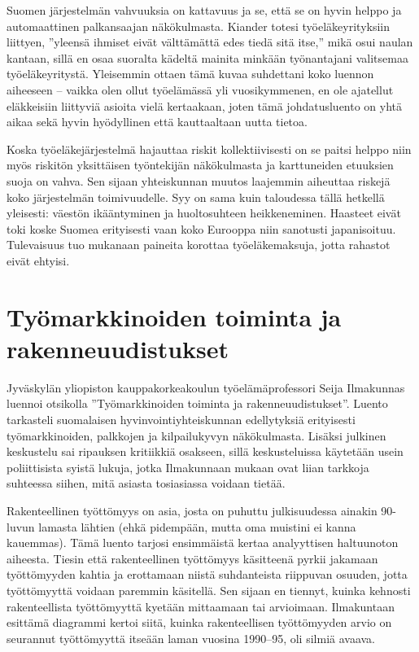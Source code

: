 \documentclass[12pt]{article}
\begin{document}
Suomen järjestelmän vahvuuksia on kattavuus ja se, että se on hyvin helppo ja
automaattinen palkansaajan näkökulmasta. Kiander totesi työeläkeyrityksiin
liittyen, ''yleensä ihmiset eivät välttämättä edes tiedä sitä itse,'' mikä osui
naulan kantaan, sillä en osaa suoralta kädeltä mainita minkään työnantajani
valitsemaa työeläkeyritystä. Yleisemmin ottaen tämä kuvaa suhdettani koko
luennon aiheeseen -- vaikka olen ollut työelämässä yli vuosikymmenen, en ole
ajatellut eläkkeisiin liittyviä asioita vielä kertaakaan, joten tämä
johdatusluento on yhtä aikaa sekä hyvin hyödyllinen että kauttaaltaan uutta
tietoa.

Koska työeläkejärjestelmä hajauttaa riskit kollektiivisesti on se paitsi helppo
niin myös riskitön yksittäisen työntekijän näkökulmasta ja karttuneiden
etuuksien suoja on vahva. Sen sijaan yhteiskunnan muutos laajemmin aiheuttaa
riskejä koko järjestelmän toimivuudelle. Syy on sama kuin taloudessa tällä
hetkellä yleisesti: väestön ikääntyminen ja huoltosuhteen heikkeneminen.
Haasteet eivät toki koske Suomea erityisesti vaan koko Eurooppa niin sanotusti
japanisoituu. Tulevaisuus tuo mukanaan paineita korottaa työeläkemaksuja, jotta
rahastot eivät ehtyisi.


\newpage
\section{Työmarkkinoiden toiminta ja rakenneuudistukset}

Jyväskylän yliopiston kauppakorkeakoulun työelämäprofessori Seija Ilmakunnas
luennoi otsikolla ''Työmarkkinoiden toiminta ja rakenneuudistukset''. Luento
tarkasteli suomalaisen hyvinvointiyhteiskunnan edellytyksiä erityisesti
työmarkkinoiden, palkkojen ja kilpailukyvyn näkökulmasta. Lisäksi julkinen
keskustelu sai ripauksen kritiikkiä osakseen, sillä keskusteluissa käytetään
usein poliittisista syistä lukuja, jotka Ilmakunnaan mukaan ovat liian tarkkoja
suhteessa siihen, mitä asiasta tosiasiassa voidaan tietää.

Rakenteellinen työttömyys on asia, josta on puhuttu julkisuudessa ainakin
90-luvun lamasta lähtien (ehkä pidempään, mutta oma muistini ei kanna
kauemmas). Tämä luento tarjosi ensimmäistä kertaa analyyttisen haltuunoton
aiheesta. Tiesin että rakenteellinen työttömyys käsitteenä pyrkii jakamaan
työttömyyden kahtia ja erottamaan niistä suhdanteista riippuvan osuuden, jotta
työttömyyttä voidaan paremmin käsitellä. Sen sijaan en tiennyt, kuinka kehnosti
rakenteellista työttömyyttä kyetään mittaamaan tai arvioimaan. Ilmakuntaan
esittämä diagrammi kertoi siitä, kuinka rakenteellisen työttömyyden arvio on
seurannut työttömyyttä itseään laman vuosina 1990--95, oli silmiä avaava.
\end{document}
